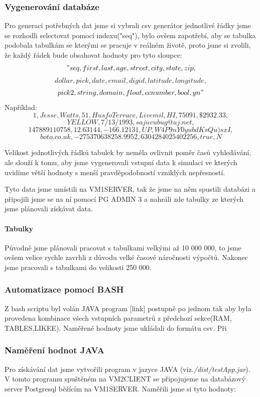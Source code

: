 \documentclass[a4paper, 11pt]{article}
\begin{document}
\subsubsection{Vygenerování databáze} \label{sec:table}

Pro generaci potřebných dat jsme si vybrali csv generátor \cite{csvgenerator} jednotlivé řádky jsme se rozhodli selectovat pomocí indexu("seq"), bylo ovšem zapotřebí, aby se tabulka podobala tabulkám se kterými se pracuje v reálném životě, proto jsme si zvolili, že každý řádek bude obsahovat hodnoty pro tyto sloupce:
$$"seq, first, last, age, street, city, state, zip, $$
$$dollar, pick, date, email, digid, latitude, longitude, $$
$$pick2, string, domain, float, ccnumber, bool, yn"$$
Například:
$$1,Jesse,Watts,51,Husfo Terrace,Livemil,HI,75091,\$2932.33,$$
$$YELLOW,7/13/1993,sajuvubug@uj.net,$$
$$147889110758,12.63144,-166.12131,UP,W4P9nY0yubdKsQu)sxI,$$
$$boto.co.uk,-275370638258.9952,6304284025402256,true,N$$


Velikost jednotlivých řádků tabulek by neměla ovlivnit poměr časů vyhledávání, ale slouží k tomu, aby jsme vygenerovali vstupní data k simulaci ve kterých uvidíme větší hodnoty s menší pravděpodobností vzniklých nepřesností.

Tyto data jsme umístili na VM1SERVER, tak že jsme na něm spustili databázi a připojili jsme se na ní pomocí PG ADMIN 3 \cite{pgadmin} a nahráli zde tabulky ze kterých jsme plánovali získávat data.
\paragraph{Tabulky}
Původně jsme plánovali pracovat s tabulkami velkými až 10 000 000, to jsme ovšem velice rychle zavrhli z důvodu velké časové náročnosti výpočtů. Nakonec jsme pracovali s tabulkami do velikosti 250 000.

\subsubsection{Automatizace pomocí BASH}
Z bash scriptu byl volán JAVA program [link] postupně po jednom tak aby byla provedena kombinace všech vstupních parametrů z předchozí sekce(RAM, TABLES,LIKEE). Naměřené hodnoty jsme ukládali do formátu csv. Při 
\subsubsection{Naměření hodnot JAVA}
Pro získávání dat jsme vytvořili program v jazyce JAVA (viz.\textit{/dist/testApp.jar}). V tomto programu spuštěném na VM2CLIENT se připojujeme na databázový server Postgresql běžícím na VM1SERVER. Naměřili jsme si tyto hodnoty:
\end{document}
